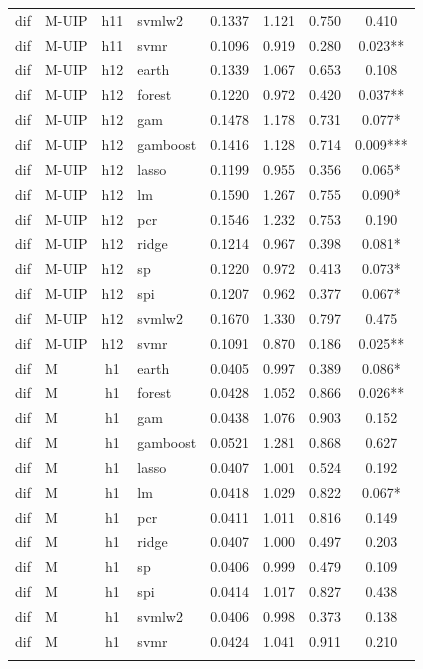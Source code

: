 \begin{ThreePartTable}
\begin{longtable}[t]{llclcccc}
dif & M-UIP & h11 & svmlw2 & 0.1337 & 1.121 & 0.750 & 0.410\\
dif & M-UIP & h11 & svmr & 0.1096 & 0.919 & 0.280 & 0.023**\\
\addlinespace
dif & M-UIP & h12 & earth & 0.1339 & 1.067 & 0.653 & 0.108\\
dif & M-UIP & h12 & forest & 0.1220 & 0.972 & 0.420 & 0.037**\\
dif & M-UIP & h12 & gam & 0.1478 & 1.178 & 0.731 & 0.077*\\
dif & M-UIP & h12 & gamboost & 0.1416 & 1.128 & 0.714 & 0.009***\\
dif & M-UIP & h12 & lasso & 0.1199 & 0.955 & 0.356 & 0.065*\\
dif & M-UIP & h12 & lm & 0.1590 & 1.267 & 0.755 & 0.090*\\
dif & M-UIP & h12 & pcr & 0.1546 & 1.232 & 0.753 & 0.190\\
dif & M-UIP & h12 & ridge & 0.1214 & 0.967 & 0.398 & 0.081*\\
dif & M-UIP & h12 & sp & 0.1220 & 0.972 & 0.413 & 0.073*\\
dif & M-UIP & h12 & spi & 0.1207 & 0.962 & 0.377 & 0.067*\\
dif & M-UIP & h12 & svmlw2 & 0.1670 & 1.330 & 0.797 & 0.475\\
dif & M-UIP & h12 & svmr & 0.1091 & 0.870 & 0.186 & 0.025**\\
\addlinespace
dif & M & h1 & earth & 0.0405 & 0.997 & 0.389 & 0.086*\\
dif & M & h1 & forest & 0.0428 & 1.052 & 0.866 & 0.026**\\
dif & M & h1 & gam & 0.0438 & 1.076 & 0.903 & 0.152\\
dif & M & h1 & gamboost & 0.0521 & 1.281 & 0.868 & 0.627\\
dif & M & h1 & lasso & 0.0407 & 1.001 & 0.524 & 0.192\\
dif & M & h1 & lm & 0.0418 & 1.029 & 0.822 & 0.067*\\
dif & M & h1 & pcr & 0.0411 & 1.011 & 0.816 & 0.149\\
dif & M & h1 & ridge & 0.0407 & 1.000 & 0.497 & 0.203\\
dif & M & h1 & sp & 0.0406 & 0.999 & 0.479 & 0.109\\
dif & M & h1 & spi & 0.0414 & 1.017 & 0.827 & 0.438\\
dif & M & h1 & svmlw2 & 0.0406 & 0.998 & 0.373 & 0.138\\
dif & M & h1 & svmr & 0.0424 & 1.041 & 0.911 & 0.210\\
\addlinespace

\end{longtable}
\end{ThreePartTable}
